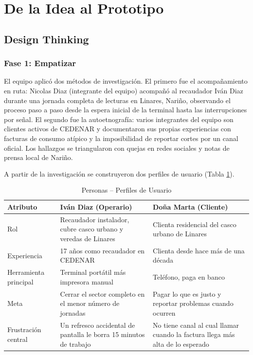 \documentclass[12pt, a4paper]{article}
\begin{document}
\newpage
\section{De la Idea al Prototipo}

\subsection{Design Thinking}

\subsubsection{Fase 1: Empatizar}

\noindent El equipo aplicó dos métodos de investigación. El primero fue el acompañamiento en ruta: Nicolas Diaz (integrante del equipo) acompañó al recaudador Iván Diaz durante una jornada completa de lecturas en Linares, Nariño, observando el proceso paso a paso desde la espera inicial de la terminal hasta las interrupciones por señal. El segundo fue la autoetnografía: varios integrantes del equipo son clientes activos de CEDENAR y documentaron sus propias experiencias con facturas de consumo atípico y la imposibilidad de reportar cortes por un canal oficial. Los hallazgos se triangularon con quejas en redes sociales y notas de prensa local de Nariño.

\vspace{6pt}
\noindent A partir de la investigación se construyeron dos perfiles de usuario (Tabla \ref{tab:personas}).

\begin{table}[H]
  \caption{Personas -- Perfiles de Usuario}
  \label{tab:personas}
  \centering
  \begin{tabular}{p{3cm} p{5.8cm} p{5.8cm}}
    \toprule
    \textbf{Atributo} & \textbf{Iván Diaz (Operario)} & \textbf{Doña Marta (Cliente)} \\
    \midrule
    Rol & Recaudador instalador, cubre casco urbano y veredas de Linares & Clienta residencial del casco urbano de Linares \\
    Experiencia & 17 años como recaudador en CEDENAR & Clienta desde hace más de una década \\
    Herramienta principal & Terminal portátil más impresora manual & Teléfono, paga en banco \\
    Meta & Cerrar el sector completo en el menor número de jornadas & Pagar lo que es justo y reportar problemas cuando ocurren \\
    Frustración central & Un refresco accidental de pantalla le borra 15 minutos de trabajo & No tiene canal al cual llamar cuando la factura llega más alta de lo esperado \\
    \bottomrule
  \end{tabular}
\end{table}
\end{document}
